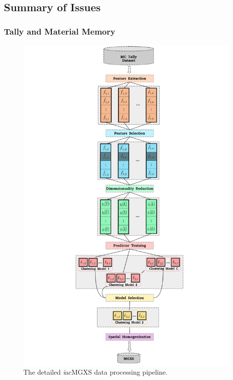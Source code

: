 \documentclass[12pt,twoside]{mitthesis-exec}
\begin{document}
\newpage
\subsection*{Summary of Issues}


\subsubsection*{Tally and Material Memory}

\begin{figure}[h!]
\centering
\includegraphics[width=0.9\linewidth]{figures/unsupervised/features/engineering/flow-chart}
\vspace{2mm}
\caption[\textit{i}MGXS flow chart]{The detailed \textit{i}ac{MGXS} data processing pipeline.}
\label{fig:imgxs-flow-chart}
\end{figure}
\end{document}
